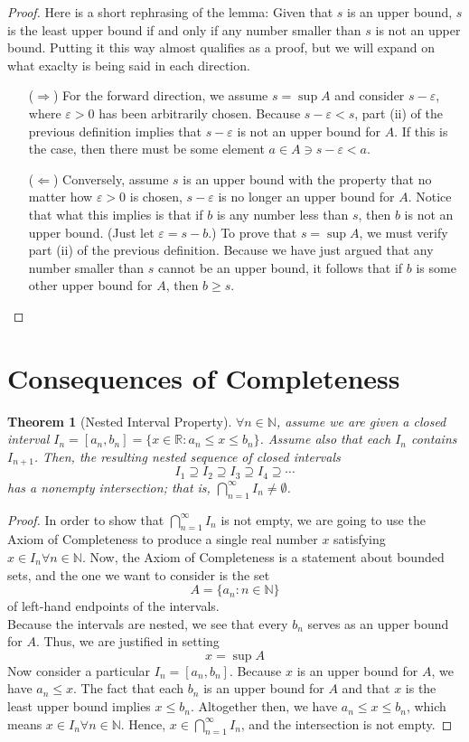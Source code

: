 \documentclass[10pt]{report}
\newtheorem{thm2}{Theorem}[section]
\newcommand{\eps}{\varepsilon}
\begin{document}
\begin{proof}
Here is a short rephrasing of the lemma: Given that $s$ is an upper bound, $s$ is the least upper bound if and only if any number smaller than $s$ is not an upper bound. Putting it this way almost qualifies as a proof, but we will expand on what exaclty is being said in each direction.
\begin{itemize}
\item[($\Rightarrow$)] For the forward direction, we assume $s=\sup A$ and consider $s-\eps$, where $\eps>0$ has been arbitrarily chosen. Because $s-\eps < s$, part (ii) of the previous definition implies that $s-\eps$ is not an upper bound for $A$. If this is the case, then there must be some element $a\in A\ni s-\eps<a$.
\item[($\Leftarrow$)] Conversely, assume $s$ is an upper bound with the property that no matter how $\eps>0$ is chosen, $s-\eps$ is no longer an upper bound for $A$. Notice that what this implies is that if $b$ is any number less than $s$, then $b$ is not an upper bound. (Just let $\eps = s - b$.) To prove that $s=\sup A$, we must verify part (ii) of the previous definition. Because we have just argued that any number smaller than $s$ cannot be an upper bound, it follows that if $b$ is some other upper bound for $A$, then $b\geq s$.
\end{itemize}
\end{proof}
\section{Consequences of Completeness}
\begin{thm2}[Nested Interval Property]
$\forall n\in \mathbb{N}$, assume we are given a closed interval $I_n = [a_n, b_n] = \{x\in \mathbb{R}: a_n \leq x \leq b_n\}$. Assume also that each $I_n$ contains $I_{n+1}$. Then, the resulting nested sequence of closed intervals
$$I_1 \supseteq I_2 \supseteq I_3 \supseteq I_4 \supseteq \cdots$$
has a nonempty intersection; that is, $\bigcap_{n=1}^\infty I_n \neq \emptyset$.
\end{thm2}
\begin{proof}
In order to show that $\bigcap_{n=1}^\infty I_n$ is not empty, we are going to use the Axiom of Completeness to produce a single real number $x$ satisfying $x\in I_n \forall n\in \mathbb{N}$. Now, the Axiom of Completeness is a statement about bounded sets, and the one we want to consider is the set
$$A = \{a_n: n\in\mathbb{N}\}$$
of left-hand endpoints of the intervals.\\
Because the intervals are nested, we see that every $b_n$ serves as an upper bound for $A$. Thus, we are justified in setting
$$x = \sup A$$
Now consider a particular $I_n = [a_n, b_n]$. Because $x$ is an upper bound for $A$, we have $a_n\leq x$. The fact that each $b_n$ is an upper bound for $A$ and that $x$ is the least upper bound implies $x\leq b_n$.
Altogether then, we have $a_n\leq x \leq b_n$, which means $x\in I_n\forall n\in\mathbb{N}$. Hence, $x\in\bigcap_{n=1}^\infty I_n$, and the intersection is not empty.
\end{proof}
\end{document}
